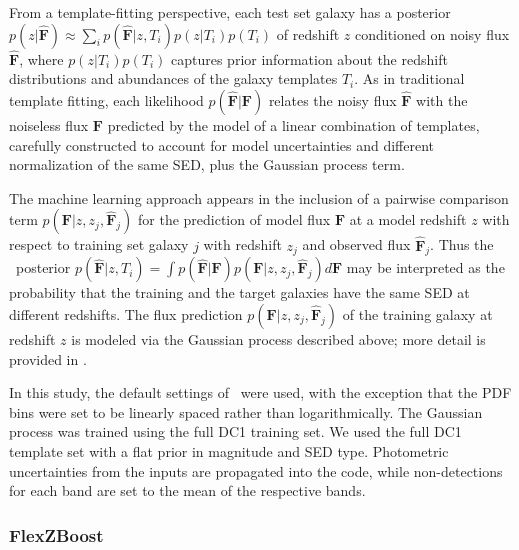 From a template-fitting perspective, each test set galaxy has a posterior $p(z \vert \mathbf{\hat{F}}) \approx \sum_i p(\mathbf{\hat{F}} \vert z, T_i) p(z \vert T_i) p(T_i)$ of redshift $z$ conditioned on noisy flux $\mathbf{\hat{F}}$, where $p(z \vert T_i) p(T_i)$ captures prior information about the redshift distributions and abundances of the galaxy templates $T_i$.
As in traditional template fitting, each likelihood $p(\mathbf{\hat{F}} \vert \mathbf{F})$ relates the noisy flux $\mathbf{\hat{F}}$ with the noiseless flux $\mathbf{F}$ predicted by the model of a linear combination of templates, carefully constructed to account for model uncertainties and different normalization of the same SED, plus the Gaussian process term.

The machine learning approach appears in the inclusion of a pairwise comparison term $p(\mathbf{F} \vert z, z_j, \mathbf{\hat{F}}_j)$ for the prediction of model flux $\mathbf{F}$ at a model redshift $z$ with respect to training set galaxy $j$ with redshift $z_j$ and observed flux $\mathbf{\hat{F}}_j$.
Thus the \pz\ posterior $p(\mathbf{\hat{F}} \vert z, T_i) = \int p(\mathbf{\hat{F}} \vert \mathbf{F}) p(\mathbf{F} \vert z, z_j, \mathbf{\hat{F}}_j) d\mathbf{F}$ may be interpreted as the probability that the training and the target galaxies have the same SED at different redshifts.
The flux prediction $p(\mathbf{F} \vert z, z_j, \mathbf{\hat{F}}_j)$ of the training galaxy at redshift $z$ is modeled via the Gaussian process described above; more detail is provided in \citet{Leistedt:17}.

In this study, the default settings of \delight\ were used, with the exception that the PDF bins were set to be linearly spaced rather than logarithmically.
The Gaussian process was trained using the full DC1 training set.
We used the full DC1 template set with a flat prior in magnitude and SED type.
Photometric uncertainties from the inputs are propagated into the code, while non-detections for each band are set to the mean of the respective bands.

\subsubsection{FlexZBoost}
\label{sec:flexzboost}


